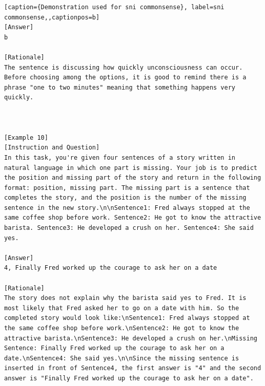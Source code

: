 \begin{lstlisting}[caption={Demonstration used for sni commonsense}, label=sni commonsense,,captionpos=b]
[Answer]
b

[Rationale]
The sentence is discussing how quickly unconsciousness can occur. Before choosing among the options, it is good to remind there is a phrase "one to two minutes" meaning that something happens very quickly.



[Example 10]
[Instruction and Question]
In this task, you're given four sentences of a story written in natural language in which one part is missing. Your job is to predict the position and missing part of the story and return in the following format: position, missing part. The missing part is a sentence that completes the story, and the position is the number of the missing sentence in the new story.\n\nSentence1: Fred always stopped at the same coffee shop before work. Sentence2: He got to know the attractive barista. Sentence3: He developed a crush on her. Sentence4: She said yes.

[Answer]
4, Finally Fred worked up the courage to ask her on a date

[Rationale]
The story does not explain why the barista said yes to Fred. It is most likely that Fred asked her to go on a date with him. So the completed story would look like:\nSentence1: Fred always stopped at the same coffee shop before work.\nSentence2: He got to know the attractive barista.\nSentence3: He developed a crush on her.\nMissing Sentence: Finally Fred worked up the courage to ask her on a date.\nSentence4: She said yes.\n\nSince the missing sentence is inserted in front of Sentence4, the first answer is "4" and the second answer is "Finally Fred worked up the courage to ask her on a date".




\end{lstlisting}
